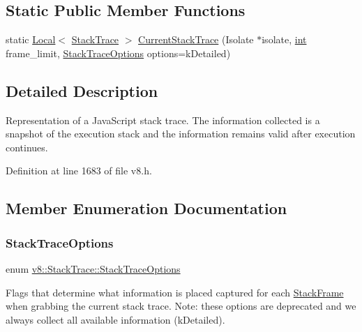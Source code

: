 \subsection*{Static Public Member Functions}
\begin{DoxyCompactItemize}
\item 
static \mbox{\hyperlink{classv8_1_1Local}{Local}}$<$ \mbox{\hyperlink{classv8_1_1StackTrace}{Stack\+Trace}} $>$ \mbox{\hyperlink{classv8_1_1StackTrace_a784e1357ed18f93f14d1fc8e9fe078cf}{Current\+Stack\+Trace}} (Isolate $\ast$isolate, \mbox{\hyperlink{classint}{int}} frame\+\_\+limit, \mbox{\hyperlink{classv8_1_1StackTrace_a9704e4a37949eb8eb8ccddbddf161492}{Stack\+Trace\+Options}} options=k\+Detailed)
\end{DoxyCompactItemize}


\subsection{Detailed Description}
Representation of a Java\+Script stack trace. The information collected is a snapshot of the execution stack and the information remains valid after execution continues. 

Definition at line 1683 of file v8.\+h.



\subsection{Member Enumeration Documentation}
\mbox{\label{classv8_1_1StackTrace_a9704e4a37949eb8eb8ccddbddf161492}} 
\subsubsection{\texorpdfstring{Stack\+Trace\+Options}{StackTraceOptions}}
{\footnotesize\ttfamily enum \mbox{\hyperlink{classv8_1_1StackTrace_a9704e4a37949eb8eb8ccddbddf161492}{v8\+::\+Stack\+Trace\+::\+Stack\+Trace\+Options}}}

Flags that determine what information is placed captured for each \mbox{\hyperlink{classv8_1_1StackFrame}{Stack\+Frame}} when grabbing the current stack trace. Note\+: these options are deprecated and we always collect all available information (k\+Detailed). 

